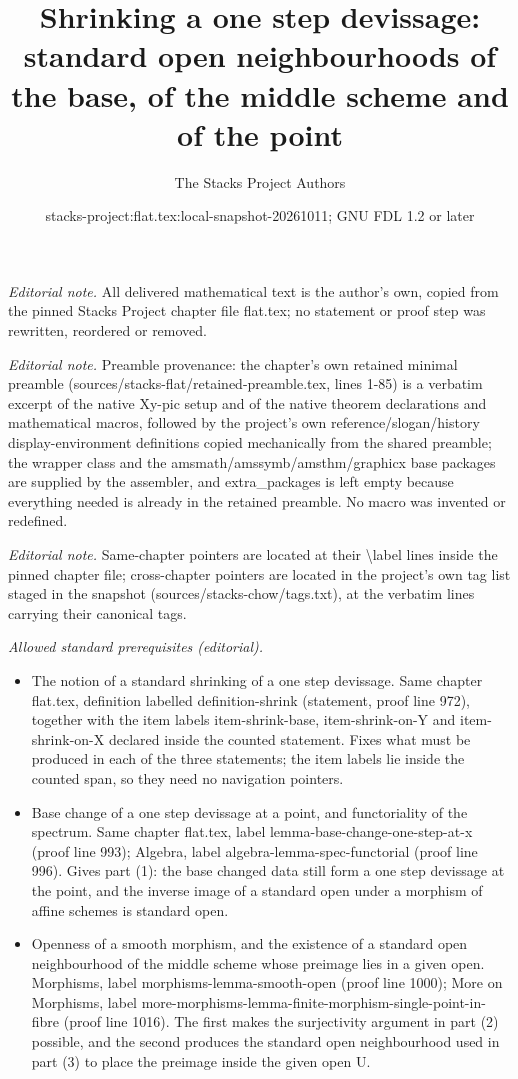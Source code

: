 \documentclass[10pt,a4paper]{amsart}
\title{Shrinking a one step devissage: standard open neighbourhoods of the base, of the middle scheme and of the point}
\author{The Stacks Project Authors}
\date{stacks-project:flat.tex:local-snapshot-20261011; GNU FDL 1.2 or later}
\theoremstyle{plain}
\theoremstyle{definition}
\theoremstyle{remark}
\numberwithin{equation}{subsection}
\begin{document}
\maketitle
\noindent\textit{Editorial note.} All delivered mathematical text is the author's own, copied from the pinned Stacks Project chapter file flat.tex; no statement or proof step was rewritten, reordered or removed.\par\medskip
\noindent\textit{Editorial note.} Preamble provenance: the chapter's own retained minimal preamble (sources/stacks-flat/retained-preamble.tex, lines 1-85) is a verbatim excerpt of the native Xy-pic setup and of the native theorem declarations and mathematical macros, followed by the project's own reference/slogan/history display-environment definitions copied mechanically from the shared preamble; the wrapper class and the amsmath/amssymb/amsthm/graphicx base packages are supplied by the assembler, and extra\_packages is left empty because everything needed is already in the retained preamble. No macro was invented or redefined.\par\medskip
\noindent\textit{Editorial note.} Same-chapter pointers are located at their \textbackslash{}label lines inside the pinned chapter file; cross-chapter pointers are located in the project's own tag list staged in the snapshot (sources/stacks-chow/tags.txt), at the verbatim lines carrying their canonical tags.\par\medskip
\noindent\textit{Allowed standard prerequisites (editorial).}\begin{itemize}
\item The notion of a standard shrinking of a one step devissage. Same chapter flat.tex, definition labelled definition-shrink (statement, proof line 972), together with the item labels item-shrink-base, item-shrink-on-Y and item-shrink-on-X declared inside the counted statement. Fixes what must be produced in each of the three statements; the item labels lie inside the counted span, so they need no navigation pointers.
\item Base change of a one step devissage at a point, and functoriality of the spectrum. Same chapter flat.tex, label lemma-base-change-one-step-at-x (proof line 993); Algebra, label algebra-lemma-spec-functorial (proof line 996). Gives part (1): the base changed data still form a one step devissage at the point, and the inverse image of a standard open under a morphism of affine schemes is standard open.
\item Openness of a smooth morphism, and the existence of a standard open neighbourhood of the middle scheme whose preimage lies in a given open. Morphisms, label morphisms-lemma-smooth-open (proof line 1000); More on Morphisms, label more-morphisms-lemma-finite-morphism-single-point-in-fibre (proof line 1016). The first makes the surjectivity argument in part (2) possible, and the second produces the standard open neighbourhood used in part (3) to place the preimage inside the given open U.
\end{itemize}\medskip
\end{document}
